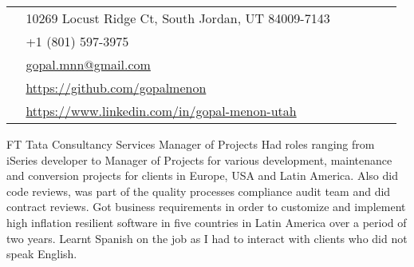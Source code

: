 \documentclass[10pt]{article} %
\begin{document}
\begin{paracol}{2}
\switchcolumn %







\parbox[top][0.12\textheight][c]{\linewidth}{ %
	\vspace{-0.04\textheight} %
	\colorbox{shade}{ %
		\begin{supertabular}{p{0.03\linewidth}|p{0.94\linewidth}} %
			\raisebox{-1pt}{\faHome} & 10269 Locust Ridge Ct, South Jordan, UT 84009-7143 \\ %
			\raisebox{-1pt}{\faPhone} & +1 (801) 597-3975 \\ %
			\raisebox{0pt}{\small\faEnvelope} & \href{mailto:gopal.mnn@gmail.com}{gopal.mnn@gmail.com} \\ %
			\raisebox{-1pt}{\small\faDesktop} & \href{https://github.com/gopalmenon}{https://github.com/gopalmenon} \\ %
			\raisebox{-1pt}{\small\faDesktop} & \href{https://www.linkedin.com/in/gopal-menon-utah}{https://www.linkedin.com/in/gopal-menon-utah} \\ %
		\end{supertabular}
	}
}


{FT} %
{Tata Consultancy Services} %
{Manager of Projects} %
{Had roles ranging from iSeries developer to Manager of Projects for various development, maintenance and conversion projects for clients in Europe, USA and Latin America. Also did code reviews, was part of the quality processes compliance audit team and did contract reviews. Got business requirements in order to customize and implement high inflation resilient software in five countries in Latin America over a period of two years. Learnt Spanish on the job as I had to interact with clients who did not speak English.}  %


\end{paracol}
\end{document}
